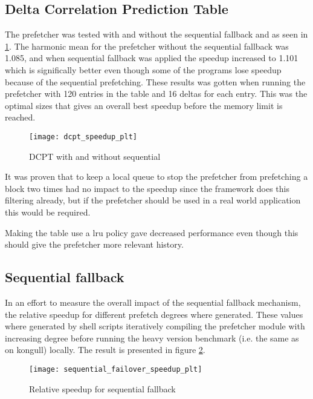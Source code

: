 \documentclass[12pt,journal,compsoc]{IEEEtran}
\begin{document}
\subsection{Delta Correlation Prediction Table}
The prefetcher was tested with and without the sequential fallback and as seen in \ref{fig:dcptspeed}. The harmonic mean for the prefetcher without the sequential fallback was 1.085, and when sequential fallback was applied the speedup increased to 1.101 which is significally better even though some of the programs lose speedup because of the sequential prefetching. These results was gotten when running the prefetcher with 120 entries in the table and 16 deltas for each entry. This was the optimal sizes that gives an overall best speedup before the memory limit is reached.

\begin{figure}
\begin{center}
\texttt{[image: dcpt\_speedup\_plt]}
\end{center}
\caption{\label{fig:dcptspeed} DCPT with and without sequential}
\end{figure}

It was proven that to keep a local queue to stop the prefetcher from prefetching a block two times had no impact to the speedup since the framework does this filtering already, but if the prefetcher should be used in a real world application this would be required.

Making the table use a lru policy gave decreased performance even though this should give the prefetcher more relevant history.

\subsection{Sequential fallback}
In an effort to measure the overall impact of the sequential fallback
mechanism, the relative speedup for different prefetch degrees where
generated. These values where generated by shell scripts iteratively
compiling the prefetcher module with increasing degree before running
the heavy version benchmark (i.e. the same as on kongull) locally. The
result is presented in figure \ref{fig:fallback}.

\begin{figure}
\begin{center}
\texttt{[image: sequential\_failover\_speedup\_plt]}
\end{center}
\caption{\label{fig:fallback} Relative speedup for sequential fallback}
\end{figure}
\end{document}

